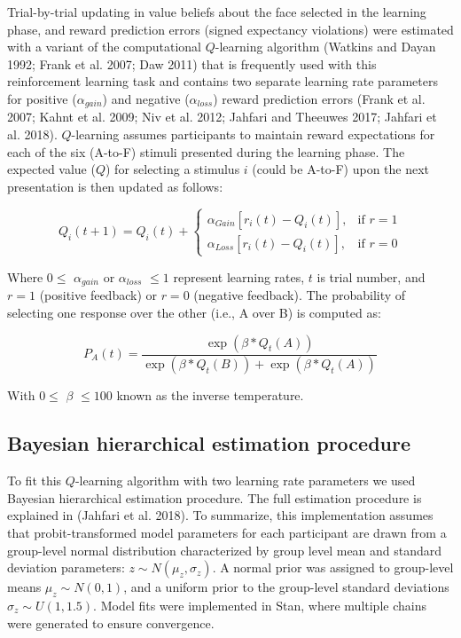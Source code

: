 \documentclass[]{article}
\begin{document}
Trial-by-trial updating in value beliefs about the face selected in the
learning phase, and reward prediction errors (signed expectancy
violations) were estimated with a variant of the computational
\(Q\)-learning algorithm (Watkins and Dayan 1992; Frank et al. 2007; Daw
2011) that is frequently used with this reinforcement learning task and
contains two separate learning rate parameters for positive
(\(\alpha_{gain}\)) and negative (\(\alpha_{loss}\)) reward prediction
errors (Frank et al. 2007; Kahnt et al. 2009; Niv et al. 2012; Jahfari
and Theeuwes 2017; Jahfari et al. 2018). \(Q\)-learning assumes
participants to maintain reward expectations for each of the six
(A-to-F) stimuli presented during the learning phase. The expected value
(\(Q\)) for selecting a stimulus \(i\) (could be A-to-F) upon the next
presentation is then updated as follows:

\[
    Q_i(t+1)=  Q_i(t) +
\begin{cases}
    \alpha_{Gain}[r_i(t)-Q_i(t)],& \text{if } r=1\\
    \alpha_{Loss}  [r_i(t)-Q_i(t)],& \text{if } r=0
\end{cases}
\]

Where \(0\leq\) \(\alpha_{gain}\) or \(\alpha_{loss}\) \(\leq 1\)
represent learning rates, \(t\) is trial number, and \(r=1\) (positive
feedback) or \(r=0\) (negative feedback). The probability of selecting
one response over the other (i.e., A over B) is computed as:

\[
    P_A(t)=  \frac{\exp(\beta * Q_t(A))} 
    {\exp(\beta * Q_t(B)) + \exp(\beta * Q_t(A))}
\]

With \(0\leq\) \(\beta\) \(\leq 100\) known as the inverse temperature.

\hypertarget{bayesian-hierarchical-estimation-procedure}{%
\subsection{Bayesian hierarchical estimation
procedure}\label{bayesian-hierarchical-estimation-procedure}}

To fit this \(Q\)-learning algorithm with two learning rate parameters
we used Bayesian hierarchical estimation procedure. The full estimation
procedure is explained in (Jahfari et al. 2018). To summarize, this
implementation assumes that probit-transformed model parameters for each
participant are drawn from a group-level normal distribution
characterized by group level mean and standard deviation parameters:
\(z \sim N(\mu_z, \sigma_z)\). A normal prior was assigned to
group-level means \(\mu_z \sim N(0,1)\), and a uniform prior to the
group-level standard deviations \(\sigma_z \sim U(1,1.5)\). Model fits
were implemented in Stan, where multiple chains were generated to ensure
convergence.
\end{document}
